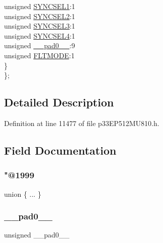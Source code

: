 \begin{DoxyCompactItemize}
\begin{tabbing}
\>\>unsigned \hyperlink{structtag_o_c6_c_o_n2_b_i_t_s_a50e73f95ab1c258ddc64f69c0991deaf}{SYNCSEL1}:1\\
\>\>unsigned \hyperlink{structtag_o_c6_c_o_n2_b_i_t_s_a304907a5d2c4cbf1114a54642a85951e}{SYNCSEL2}:1\\
\>\>unsigned \hyperlink{structtag_o_c6_c_o_n2_b_i_t_s_a6bbd1bd2ead6c9fa713969c6eb0f0c75}{SYNCSEL3}:1\\
\>\>unsigned \hyperlink{structtag_o_c6_c_o_n2_b_i_t_s_a0cd5bbe196c7974953909d27a6307bb7}{SYNCSEL4}:1\\
\>\>unsigned \hyperlink{structtag_o_c6_c_o_n2_b_i_t_s_adf71f3d8410c1f1dbbc96680a92c49af}{\_\_pad0\_\_}:9\\
\>\>unsigned \hyperlink{structtag_o_c6_c_o_n2_b_i_t_s_ad53c2a5303780172219bfd5e0100c782}{FLTMODE}:1\\
\>\} \\
\}; \\

\end{tabbing}\end{DoxyCompactItemize}


\subsection{Detailed Description}


Definition at line 11477 of file p33\+E\+P512\+M\+U810.\+h.



\subsection{Field Documentation}
\mbox{\label{structtag_o_c6_c_o_n2_b_i_t_s_a0f3b3f82c7509e527076d8b37842f321}} 
\subsubsection{\texorpdfstring{"@1999}{@1999}}
{\footnotesize\ttfamily union \{ ... \} }

\mbox{\label{structtag_o_c6_c_o_n2_b_i_t_s_adf71f3d8410c1f1dbbc96680a92c49af}} 
\subsubsection{\texorpdfstring{\+\_\+\+\_\+pad0\+\_\+\+\_\+}{\_\_pad0\_\_}}
{\footnotesize\ttfamily unsigned \+\_\+\+\_\+pad0\+\_\+\+\_\+}



